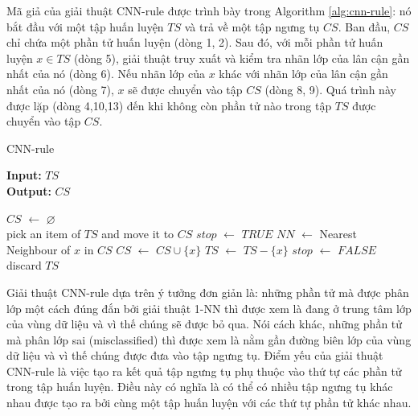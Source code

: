 \documentclass[13pt,oneside]{scrbook}
\newcommand*\Let[2]{\State #1 $\gets$ #2}
\let\emptyset\varnothing
\begin{document}
Mã giả của giải thuật CNN-rule được trình bày trong Algorithm \ref{alg:cnn-rule}: nó bắt đầu với một tập huấn luyện $TS$ và trả về một tập ngưng tụ $CS$. Ban đầu, $CS$ chỉ chứa một phần tử huấn luyện (dòng 1, 2). 
Sau đó, với mỗi phần tử huấn luyện $x \in TS$ (dòng 5), giải thuật truy xuất và kiểm tra nhãn lớp của lân cận gần nhất của nó (dòng 6).
Nếu nhãn lớp của $x$ khác với nhãn lớp của lân cận gần nhất của nó (dòng 7), $x$ sẽ được chuyển vào tập $CS$ (dòng 8, 9).
Quá trình này được lặp (dòng 4,10,13) đến khi không còn phần tử nào trong tập $TS$ được chuyển vào tập $CS$.
\begin{algorithm}[h!]
  \caption{CNN-rule
   \label{alg:cnn-rule}}
    \textbf{Input:} $TS$\\
    \textbf{Output:} $CS$
  \begin{algorithmic}[1]
      \Let{$CS$}{$\emptyset$}
      \\{pick an item of $TS$ and move it to $CS$}
      \Repeat
          \Let{$stop$}{$TRUE$}
              \Let{$NN$}{Nearest Neighbour of $x$ in $CS$}
              \Let{$CS$}{$CS \cup \{x\}$}
              \Let{$TS$}{$TS-\{x\}$}
              \Let{$stop$}{$FALSE$}
              \EndIf
          \EndFor
       \\{discard $TS$}
       \State {}
  \end{algorithmic}
\end{algorithm}

Giải thuật CNN-rule dựa trên ý tưởng đơn giản là: những phần tử mà được phân lớp một cách đúng đắn bởi giải thuật 1-NN thì được xem là đang ở trung tâm lớp của vùng dữ liệu và vì thế chúng sẽ được bỏ qua. 
Nói cách khác, những phần tử mà phân lớp sai (misclassified) thì được xem là nằm gần đường biên lớp của vùng dữ liệu và vì thế chúng được đưa vào tập ngưng tụ. 
Điểm yếu của giải thuật CNN-rule là việc tạo ra kết quả tập ngưng tụ phụ thuộc vào thứ tự các phần tử trong tập huấn luyện.
Điều này có nghĩa là có thể có nhiều tập ngưng tụ khác nhau được tạo ra bởi cùng một tập huấn luyện với các thứ tự phần tử khác nhau.
\end{document}
